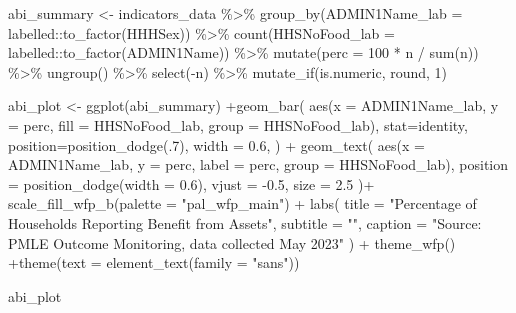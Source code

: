 \documentclass[
  letterpaper,
  DIV=11,
  numbers=noendperiod]{scrreprt}
\newenvironment{Shaded}{\begin{snugshade}}{\end{snugshade}}
\newcommand{\AttributeTok}[1]{\textcolor[rgb]{0.40,0.45,0.13}{#1}}
\newcommand{\DecValTok}[1]{\textcolor[rgb]{0.68,0.00,0.00}{#1}}
\newcommand{\FloatTok}[1]{\textcolor[rgb]{0.68,0.00,0.00}{#1}}
\newcommand{\FunctionTok}[1]{\textcolor[rgb]{0.28,0.35,0.67}{#1}}
\newcommand{\NormalTok}[1]{\textcolor[rgb]{0.00,0.23,0.31}{#1}}
\newcommand{\OtherTok}[1]{\textcolor[rgb]{0.00,0.23,0.31}{#1}}
\newcommand{\SpecialCharTok}[1]{\textcolor[rgb]{0.37,0.37,0.37}{#1}}
\newcommand{\StringTok}[1]{\textcolor[rgb]{0.13,0.47,0.30}{#1}}
\begin{document}
\begin{Shaded}
\begin{Highlighting}[]
\NormalTok{abi\_summary }\OtherTok{\textless{}{-}}\NormalTok{ indicators\_data }\SpecialCharTok{\%\textgreater{}\%} 
  \FunctionTok{group\_by}\NormalTok{(}\AttributeTok{ADMIN1Name\_lab =}\NormalTok{ labelled}\SpecialCharTok{::}\FunctionTok{to\_factor}\NormalTok{(HHHSex)) }\SpecialCharTok{\%\textgreater{}\%}
  \FunctionTok{count}\NormalTok{(}\AttributeTok{HHSNoFood\_lab =}\NormalTok{ labelled}\SpecialCharTok{::}\FunctionTok{to\_factor}\NormalTok{(ADMIN1Name)) }\SpecialCharTok{\%\textgreater{}\%}
  \FunctionTok{mutate}\NormalTok{(}\AttributeTok{perc =} \DecValTok{100} \SpecialCharTok{*}\NormalTok{ n }\SpecialCharTok{/} \FunctionTok{sum}\NormalTok{(n)) }\SpecialCharTok{\%\textgreater{}\%}
  \FunctionTok{ungroup}\NormalTok{() }\SpecialCharTok{\%\textgreater{}\%} \FunctionTok{select}\NormalTok{(}\SpecialCharTok{{-}}\NormalTok{n) }\SpecialCharTok{\%\textgreater{}\%} \FunctionTok{mutate\_if}\NormalTok{(is.numeric, round, }\DecValTok{1}\NormalTok{) }


\NormalTok{abi\_plot }\OtherTok{\textless{}{-}} \FunctionTok{ggplot}\NormalTok{(abi\_summary) }\SpecialCharTok{+}\FunctionTok{geom\_bar}\NormalTok{(}
  \FunctionTok{aes}\NormalTok{(}\AttributeTok{x =}\NormalTok{ ADMIN1Name\_lab, }\AttributeTok{y =}\NormalTok{ perc, }\AttributeTok{fill =}\NormalTok{ HHSNoFood\_lab, }\AttributeTok{group =}\NormalTok{ HHSNoFood\_lab), }
  \AttributeTok{stat=}\StringTok{\textquotesingle{}identity\textquotesingle{}}\NormalTok{, }\AttributeTok{position=}\FunctionTok{position\_dodge}\NormalTok{(.}\DecValTok{7}\NormalTok{),  }\AttributeTok{width =} \FloatTok{0.6}\NormalTok{,}
\NormalTok{) }\SpecialCharTok{+}
  \FunctionTok{geom\_text}\NormalTok{(}
    \FunctionTok{aes}\NormalTok{(}\AttributeTok{x =}\NormalTok{ ADMIN1Name\_lab, }\AttributeTok{y =}\NormalTok{ perc, }\AttributeTok{label =}\NormalTok{ perc, }\AttributeTok{group =}\NormalTok{ HHSNoFood\_lab),}
    \AttributeTok{position =} \FunctionTok{position\_dodge}\NormalTok{(}\AttributeTok{width =} \FloatTok{0.6}\NormalTok{),}
    \AttributeTok{vjust =} \SpecialCharTok{{-}}\FloatTok{0.5}\NormalTok{, }\AttributeTok{size =} \FloatTok{2.5}
\NormalTok{  )}\SpecialCharTok{+}
  \FunctionTok{scale\_fill\_wfp\_b}\NormalTok{(}\AttributeTok{palette =} \StringTok{"pal\_wfp\_main"}\NormalTok{) }\SpecialCharTok{+}
  \FunctionTok{labs}\NormalTok{(}
    \AttributeTok{title =} \StringTok{"Percentage of Households Reporting Benefit from Assets"}\NormalTok{,}
    \AttributeTok{subtitle =} \StringTok{""}\NormalTok{,}
    \AttributeTok{caption =} \StringTok{"Source: PMLE Outcome Monitoring, data collected May 2023"}
\NormalTok{  ) }\SpecialCharTok{+} \FunctionTok{theme\_wfp}\NormalTok{() }\SpecialCharTok{+}\FunctionTok{theme}\NormalTok{(}\AttributeTok{text =} \FunctionTok{element\_text}\NormalTok{(}\AttributeTok{family =} \StringTok{"sans"}\NormalTok{))}

\NormalTok{abi\_plot}
\end{Highlighting}
\end{Shaded}
\end{document}
